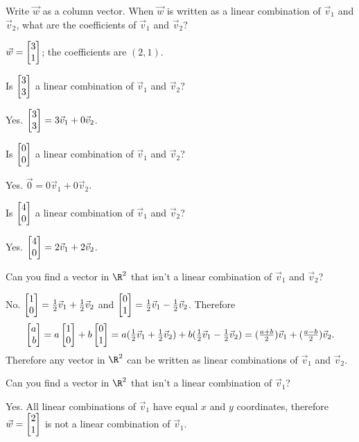 	\begin{parts}
		\item Write $\vec w$ as a column vector. When $\vec w$ is written as a
			linear combination of $\vec v_1$ and $\vec v_2$, what are the
			coefficients of $\vec v_1$ and $\vec v_2$?
			\begin{solution}
				$\vec w=\mat{3\\1}$; the coefficients are $(2,1)$.
			\end{solution}
		\item Is $\mat{3\\3}$ a linear combination of $\vec v_1$ and $\vec v_2$?
			\begin{solution}[inline]
				Yes. $\mat{3\\3}=3\vec v_1+0\vec v_2$.
			\end{solution}

		\item Is $\mat{0\\0}$ a linear combination of $\vec v_1$ and $\vec v_2$?
			\begin{solution}[inline]
				Yes. $\vec 0=0\vec v_1+0\vec v_2$.
			\end{solution}
		\item Is $\mat{4\\0}$ a linear combination of $\vec v_1$ and $\vec v_2$?
			\begin{solution}[inline]
				Yes. $\mat{4\\0}=2\vec v_1+2\vec v_2$.
			\end{solution}
		\item Can you find a vector in $\R^2$ that isn't a linear combination of
		$\vec v_1$ and $\vec v_2$?
			\begin{solution}
				No. $\mat{1\\0}=\tfrac{1}{2}\vec v_1+\tfrac{1}{2}\vec v_2$ and
				$\mat{0\\1}=\tfrac{1}{2}\vec v_1-\tfrac{1}{2}\vec v_2$.
				Therefore
				\[
					\mat{a\\b}
					= a\mat{1\\0}+b\mat{0\\1}
					= a(\tfrac{1}{2}\vec v_1+\tfrac{1}{2}\vec v_2)
						+b(\tfrac{1}{2}\vec v_1-\tfrac{1}{2}\vec v_2)
					=(\tfrac{a+b}{2})\vec v_1+(\tfrac{a-b}{2})\vec v_2.
				\]
				Therefore any vector in $\R^2$ can be written as linear combinations
				of $\vec v_1$ and $\vec v_2$.
			\end{solution}
		\item Can you find a vector in $\R^2$ that isn't a linear combination of
			$\vec v_1$?
			\begin{solution}
				Yes. All linear combinations of $\vec v_1$ have equal $x$ and
				$y$ coordinates, therefore $\vec w=\mat{2\\1}$ is not a linear
				combination of $\vec v_1$.
			\end{solution}
	\end{parts}


